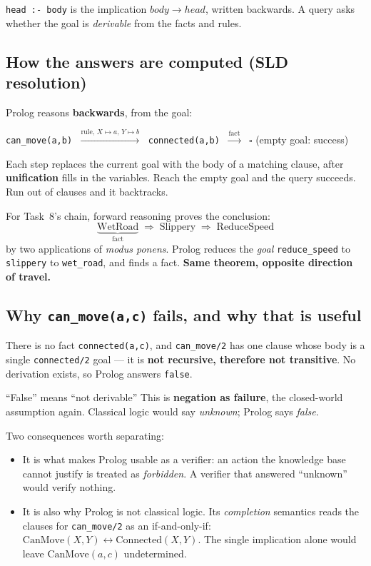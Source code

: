 \documentclass[11pt,a4paper]{article}
\begin{document}
\texttt{head :- body} is the implication $\mathit{body} \rightarrow
\mathit{head}$, written backwards. A query asks whether the goal is
\emph{derivable} from the facts and rules.

\subsection{How the answers are computed (SLD resolution)}

Prolog reasons \textbf{backwards}, from the goal:

\begin{center}
\texttt{can\_move(a,b)}
$\;\xrightarrow{\text{rule, } X\mapsto a,\, Y\mapsto b}\;$
\texttt{connected(a,b)}
$\;\xrightarrow{\text{fact}}\;$
$\square$ \quad(empty goal: success)
\end{center}

Each step replaces the current goal with the body of a matching clause, after
\textbf{unification} fills in the variables. Reach the empty goal and the query
succeeds. Run out of clauses and it backtracks.

For Task~8's chain, forward reasoning proves the conclusion:
\[
  \underbrace{\mathrm{WetRoad}}_{\text{fact}}
  \;\Longrightarrow\;
  \mathrm{Slippery}
  \;\Longrightarrow\;
  \mathrm{ReduceSpeed}
\]
by two applications of \emph{modus ponens}. Prolog reduces the \emph{goal}
\texttt{reduce\_speed} to \texttt{slippery} to \texttt{wet\_road}, and finds a
fact. \textbf{Same theorem, opposite direction of travel.}

\subsection{Why \texttt{can\_move(a,c)} fails, and why that is useful}

There is no fact \texttt{connected(a,c)}, and \texttt{can\_move/2} has one
clause whose body is a single \texttt{connected/2} goal --- it is \textbf{not
recursive, therefore not transitive}. No derivation exists, so Prolog answers
\texttt{false}.

\begin{warnbox}{``False'' means ``not derivable''}
This is \textbf{negation as failure}, the closed-world assumption again.
Classical logic would say \emph{unknown}; Prolog says \emph{false}.

Two consequences worth separating:
\begin{itemize}
  \item It is what makes Prolog usable as a verifier: an action the knowledge
        base cannot justify is treated as \emph{forbidden}. A verifier that
        answered ``unknown'' would verify nothing.
  \item It is also why Prolog is not classical logic. Its \emph{completion}
        semantics reads the clauses for \texttt{can\_move/2} as an
        if-and-only-if: $\mathrm{CanMove}(X,Y) \leftrightarrow
        \mathrm{Connected}(X,Y)$. The single implication alone would leave
        $\mathrm{CanMove}(a,c)$ undetermined.
\end{itemize}
\end{warnbox}
\end{document}
